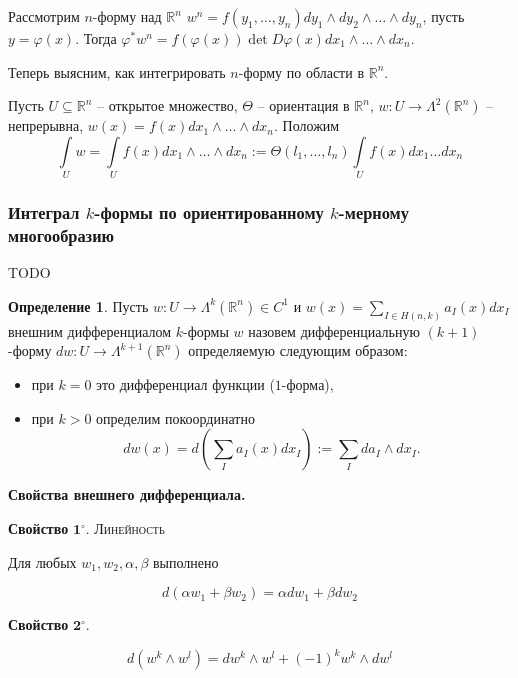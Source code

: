 \documentclass[a5paper]{article}
\newcounter{through}
\theoremstyle{plain}
\theoremstyle{definition}
\newtheorem{definition}[through]{Определение}
\numberwithin{through}{section}
\numberwithin{equation}{section}
\begin{document}
Рассмотрим $n$-форму над $\mathbb{R}^n$ $w^n = f(y_1,\ldots,y_n)dy_1 \wedge dy_2 \wedge\ldots \wedge dy_n$, пусть $y=\varphi(x)$.
Тогда $\varphi^*w^n = f(\varphi(x)) \det D\varphi(x) dx_1\wedge\ldots\wedge dx_n$.

\medskip
Теперь выясним, как интегрировать $n$-форму по области в $\mathbb{R}^n$.

Пусть $U \subseteq \mathbb{R}^n$ -- открытое множество, $\Theta$ -- ориентация в $\mathbb{R}^n$, $w : U \to \Lambda^2(\mathbb{R}^n)$ -- непрерывна, $w(x) = f(x) dx_1 \wedge\ldots\wedge dx_n$. Положим
\[ \int\limits_U w = \int\limits_U f(x)dx_1\wedge \ldots \wedge dx_n := 
\Theta(l_1,\ldots, l_n) \int\limits_U f(x)dx_1\ldots dx_n \]

\subsubsection{Интеграл $k$-формы по ориентированному $k$-мерному многообразию}

TODO

\begin{definition}
	Пусть $w : U \to \Lambda^k(\mathbb{R}^n) \in C^1$ и $w(x) = \sum\limits_{I \in H(n, k)} a_I (x) dx_I$
	внешним дифференциалом $k$-формы $w$ назовем дифференциальную $(k+1)$-форму $dw : U \to \Lambda^{k+1}(\mathbb{R}^n)$
	определяемую следующим образом:
	\begin{itemize}
		\item
		при $k = 0$ это дифференциал функции ($1$-форма),
		
		\item 
		при $k > 0$ определим покоординатно
		\[ dw(x) = d \left( \sum_I a_I(x)dx_I \right) := \sum_I da_I \wedge dx_I.  \]
	\end{itemize}
\end{definition}
{\bf Свойства внешнего дифференциала.}

\medskip
{\bf Свойство} $\mathbf{1^\circ.}$
{\textsc{Линейность}}

Для любых $w_1, w_2, \alpha, \beta$ выполнено

\begin{equation*}
	d(\alpha w_1 + \beta w_2) = \alpha dw_1 + \beta dw_2
\end{equation*}

\medskip
{\bf Свойство} $\mathbf{2^\circ.}$

\begin{equation*}
	d(w^k \wedge w^l)  = dw^k \wedge w^l + (-1)^k w^k \wedge dw^l
\end{equation*}
\end{document}
